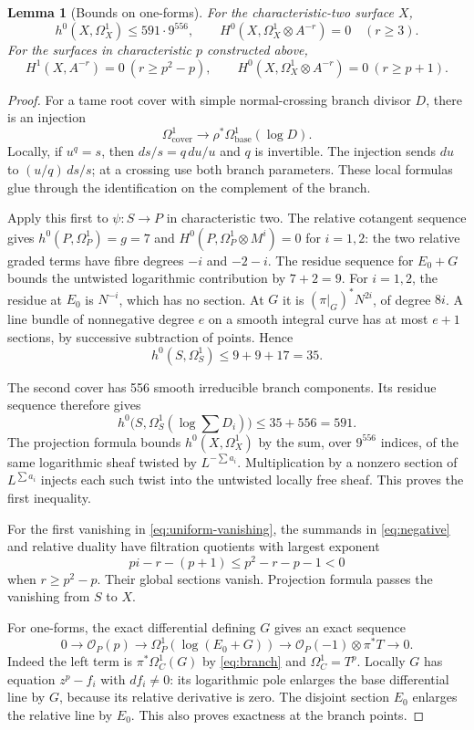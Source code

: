 \documentclass[11pt,a4paper]{article}
\newcommand{\OO}{\mathcal O}
\newtheorem{lemma}[theorem]{Lemma}
\theoremstyle{definition}\newtheorem{definition}[theorem]{Definition}
\theoremstyle{remark}\newtheorem{remark}[theorem]{Remark}
\numberwithin{equation}{section}
\begin{document}
\begin{lemma}[Bounds on one-forms]\label{lem:differentials}
For the characteristic-two surface $X$,
\[
 h^0(X,\Omega_X^1)\le591\cdot9^{556},\qquad
 H^0(X,\Omega_X^1\otimes A^{-r})=0\quad(r\ge3).
\]
For the surfaces in characteristic $p$ constructed above,
\begin{equation}\label{eq:uniform-vanishing}
 H^1(X,A^{-r})=0\ (r\ge p^2-p),\qquad
 H^0(X,\Omega_X^1\otimes A^{-r})=0\ (r\ge p+1).
\end{equation}
\end{lemma}
\begin{proof}
For a tame root cover with simple normal-crossing branch divisor $D$, there is an injection
\[
 \Omega^1_{\text{cover}}\longrightarrow\rho^*\Omega^1_{\text{base}}(\log D).
\]
Locally, if $u^q=s$, then $ds/s=q\,du/u$ and $q$ is invertible. The injection sends $du$ to $(u/q)\,ds/s$; at a crossing use both branch parameters. These local formulas glue through the identification on the complement of the branch.

Apply this first to $\psi:S\to P$ in characteristic two. The relative cotangent sequence gives $h^0(P,\Omega_P^1)=g=7$ and
$H^0(P,\Omega_P^1\otimes M^i)=0$ for $i=1,2$: the two relative graded terms have fibre degrees $-i$ and $-2-i$. The residue sequence for $E_0+G$ bounds the untwisted logarithmic contribution by $7+2=9$. For $i=1,2$, the residue at $E_0$ is $N^{-i}$, which has no section. At $G$ it is $(\pi|_G)^*N^{2i}$, of degree $8i$. A line bundle of nonnegative degree $e$ on a smooth integral curve has at most $e+1$ sections, by successive subtraction of points. Hence
\[
 h^0(S,\Omega_S^1)\le9+9+17=35.
\]

The second cover has 556 smooth irreducible branch components. Its residue sequence therefore gives
\[
 h^0\bigl(S,\Omega_S^1(\log\textstyle\sum D_i)\bigr)\le35+556=591.
\]
The projection formula bounds $h^0(X,\Omega_X^1)$ by the sum, over $9^{556}$ indices, of the same logarithmic sheaf twisted by $L^{-\sum a_i}$. Multiplication by a nonzero section of $L^{\sum a_i}$ injects each such twist into the untwisted locally free sheaf. This proves the first inequality.

For the first vanishing in \eqref{eq:uniform-vanishing}, the summands in \eqref{eq:negative} and relative duality have filtration quotients with largest exponent
\[
 pi-r-(p+1)\le p^2-r-p-1<0
\]
when $r\ge p^2-p$. Their global sections vanish. Projection formula passes the vanishing from $S$ to $X$.

For one-forms, the exact differential defining $G$ gives an exact sequence
\begin{equation}\label{eq:ruled-log}
 0\longrightarrow\OO_P(p)\longrightarrow
 \Omega_P^1(\log(E_0+G))\longrightarrow
 \OO_P(-1)\otimes\pi^*T\longrightarrow0.
\end{equation}
Indeed the left term is $\pi^*\Omega_C^1(G)$ by \eqref{eq:branch} and $\Omega_C^1=T^p$. Locally $G$ has equation $z^p-f_i$ with $df_i\ne0$: its logarithmic pole enlarges the base differential line by $G$, because its relative derivative is zero. The disjoint section $E_0$ enlarges the relative line by $E_0$. This also proves exactness at the branch points.


\end{proof}
\end{document}
